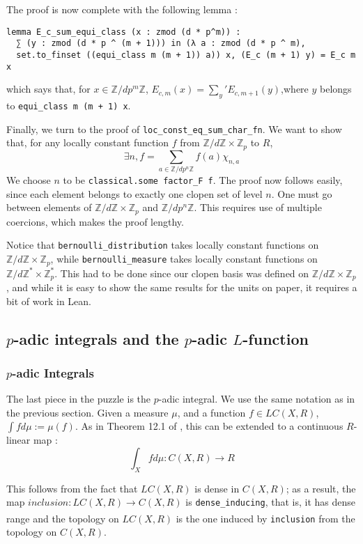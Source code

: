\documentclass[a4paper,UKenglish,cleveref, autoref, thm-restate]{lipics-v2021}
\newcommand{\lean}[1]{\texttt{#1}\xspace} %
\begin{document}
The proof is now complete with the following lemma :
\begin{lstlisting}
lemma E_c_sum_equi_class (x : zmod (d * p^m)) :
  ∑ (y : zmod (d * p ^ (m + 1))) in (λ a : zmod (d * p ^ m), 
  set.to_finset ((equi_class m (m + 1)) a)) x, (E_c (m + 1) y) = E_c m x
\end{lstlisting}
which says that, for $x \in \mathbb{Z}/dp^m \mathbb{Z}$, $E_{c, m} (x) = \sum_{y}' E_{c, m + 1} (y)$,\newline where $y$ belongs to \lean{equi\_class m (m + 1) x}. 

Finally, we turn to the proof of \lean{loc\_const\_eq\_sum\_char\_fn}. We want to show that, for any locally constant function $f$ from 
$\mathbb{Z}/d \mathbb{Z} \times \mathbb{Z}_p$ to $R$, 
$$\exists n, f = \sum_{a \in \mathbb{Z}/dp^n \mathbb{Z}} f(a) \chi_{n, a}$$
We choose $n$ to be \lean{classical.some factor\_F f}. The proof now follows easily, since each element belongs to exactly one clopen set of level $n$. One must go 
between elements of $\mathbb{Z}/d \mathbb{Z} \times \mathbb{Z}_p$ and $\mathbb{Z}/dp^n \mathbb{Z}$. This requires use of multiple coercions, which makes the proof lengthy. 

Notice that \lean{bernoulli\_distribution} takes locally constant functions on $\mathbb{Z}/d \mathbb{Z} \times \mathbb{Z}_p$, 
while \newline \lean{bernoulli\_measure} takes locally constant functions on $\mathbb{Z}/d \mathbb{Z}^* \times \mathbb{Z}_p^*$. This had to be done since our clopen basis was defined on 
$\mathbb{Z}/d \mathbb{Z} \times \mathbb{Z}_p$, and while it is easy to show the same results for the units on paper, it requires a bit of work in Lean.

\subsection{$p$-adic integrals and the $p$-adic $L$-function}
\subsubsection{$p$-adic Integrals}
The last piece in the puzzle is the $p$-adic integral. We use the same notation as in the previous
section. Given a measure $\mu$, and a function $f \in LC(X, R)$,
$\int f d\mu := \mu(f)$. As in Theorem 12.1 of \cite{cyc}, this can be extended to a
continuous $R$-linear map :
$$ \int_X f d\mu : C(X, R) \xrightarrow[]{} R $$

This follows from the fact that $LC(X, R)$ is dense in $C(X, R)$; as a result, the map 
\newline $inclusion : LC(X, R) \xrightarrow[]{} C(X, R)$
is \lean{dense\_inducing}, that is, it has dense range and the topology on $LC(X, R)$ is the one
induced by \lean{inclusion} from the topology on $C(X,R)$. 
\end{document}
